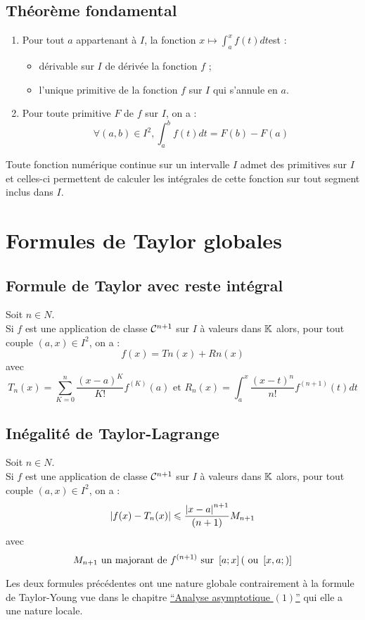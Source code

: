 \subsection{Théorème fondamental}
\begin{theo}
    \begin{enumerate}
        \item Pour tout \(a\) appartenant à \(I\), la fonction \(x \mapsto \int^x_a f (t) dt \)est :
        \begin{itemize}
            \item dérivable sur \(I\) de dérivée la fonction \(f\) ;
            \item l’unique primitive de la fonction \(f\) sur \(I\) qui s’annule en \(a\).
        \end{itemize}
        \item Pour toute primitive \(F\) de \(f\) sur \(I\), on a :
        \[\forall (a, b) \in  I^2,\int^b_a f (t) dt = F (b) -  F (a)\]
    \end{enumerate}
\end{theo}
\begin{defprop}
    Toute fonction numérique continue sur un intervalle \(I\) admet des primitives sur \(I\) et celles-ci permettent de calculer les intégrales de cette fonction sur tout segment inclus dans \(I\).
\end{defprop}
\section{Formules de Taylor globales}
\subsection{Formule de Taylor avec reste intégral}
\begin{defprop}
    Soit \(n \in  N\). \\
    Si \(f\) est une application de classe \(\cal{C}^{n+1}\) sur \(I\) à valeurs dans \(\K\) alors, pour tout couple \((a, x) \in  I^2\), on a :
    \[f (x) = Tn(x) + Rn(x)\]
    avec
    \[ T_n(x) = \sum^n_{K=0}\frac{(x -  a)^K}{K!} f^{(K)}(a) \text{ et } R_n(x) =\int^x_a \frac{(x -  t)^n}{n!} f^{(n+1)}(t) dt\]
\end{defprop}
\subsection{Inégalité de Taylor-Lagrange}
\begin{defprop}
    Soit \(n \in  N\).\\
    Si \(f\) est une application de classe \(\cal{C}^{n+1}\) sur \(I\) à valeurs dans \(\K\) alors, pour tout couple \((a, x) \in  I^2\), on a :
    \[\abs{f (x) -  T_n(x)} \leq \frac{\abs{x -  a}^{n+1}}{(n + 1)}M_{n+1}\]
    avec
    \[M_{n+1} \text{ un majorant de }f^{(n+1)} \text{ sur } \intervii{a}{x} (\text{ ou } \intervii{x, a})\]
\end{defprop}
\begin{defprop}[Remarque]
Les deux formules précédentes ont une nature globale contrairement à la formule de Taylor-Young vue dans le chapitre \hyperref[chap:analyse-asymptotique1]{“Analyse asymptotique \((1)\)”} qui elle a une nature locale.
\end{defprop}